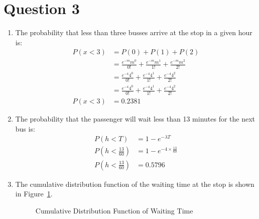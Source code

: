 \section*{Question 3}
\begin{enumerate}[label=(\alph*)]
\item
The probability that less than three busses arrive at the stop in a given hour is:
\begin{align*}
	P(x < 3) &= P(0) + P(1) + P(2) \\
	&= \frac{e^{-m}m^0}{0!} + \frac{e^{-m}m^1}{1!} + \frac{e^{-m}m^2}{2!} \\
	&= \frac{e^{-4}4^0}{0!} + \frac{e^{-4}4^1}{1!} + \frac{e^{-4}4^2}{2!} \\
	&= \frac{e^{-4}4^0}{0!} + \frac{e^{-4}4^1}{1!} + \frac{e^{-4}4^2}{2!} \\
	P(x < 3) &= 0.2381
\end{align*}

\item
The probability that the passenger will wait less than 13 minutes for the next bus is:
\begin{align*}
	P(h < T) &= 1 - e^{-\lambda T} \\
	P(h < \frac{13}{60}) &= 1 - e^{-4 \times \frac{13}{60}} \\
	P(h < \frac{13}{60}) &= 0.5796
\end{align*}

\item
The cumulative distribution function of the waiting time at the stop is shown in Figure~\ref{fig:q3}.
\begin{figure}[htp]
\centering
{}
\caption{Cumulative Distribution Function of Waiting Time}
\label{fig:q3}
\end{figure}

\end{enumerate}
